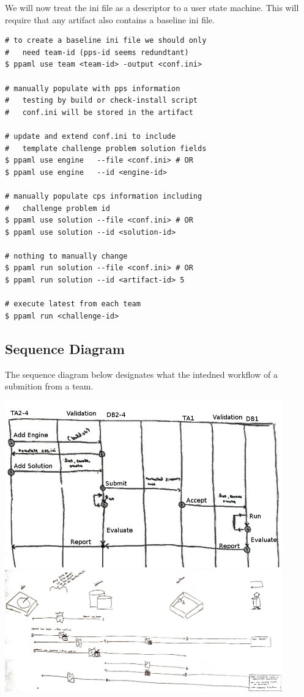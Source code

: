 \documentclass[11pt]{article} %
\begin{document}
\begin{multicols}{2}
  We will now treat the ini file as a descriptor to a user state machine. This will require that any artifact also contains a baseline ini file.
  \begin{lstlisting}
# to create a baseline ini file we should only
#   need team-id (pps-id seems redundtant)
$ ppaml use team <team-id> -output <conf.ini>

# manually populate with pps information
#   testing by build or check-install script
#   conf.ini will be stored in the artifact

# update and extend conf.ini to include
#   template challenge problem solution fields
$ ppaml use engine   --file <conf.ini> # OR
$ ppaml use engine   --id <engine-id>

# manually populate cps information including 
#   challenge problem id
$ ppaml use solution --file <conf.ini> # OR
$ ppaml use solution --id <solution-id>

# nothing to manually change
$ ppaml run solution --file <conf.ini> # OR
$ ppaml run solution --id <artifact-id> 5

# execute latest from each team
$ ppaml run <challenge-id>
  \end{lstlisting}
  \vfill
  \end{multicols}

  \subsection*{Sequence Diagram}

  The sequence diagram below designates what the intedned workflow of a submition from a team. 

  \begin{center}
  \includegraphics[width=0.9\textwidth]{sequence_diagram.jpg}
  \includegraphics[width=0.9\textwidth]{more_sequence.jpg}
  \end{center}
\end{document}
